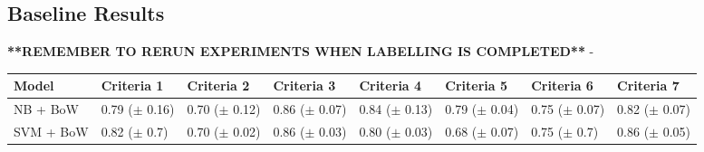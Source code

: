 \documentclass[a4paper,twoside,phd]{BYUPhys}
\begin{document}
\subsection{Baseline Results}
\label{sec:BaselineResults}
\textbf{**REMEMBER TO RERUN EXPERIMENTS WHEN LABELLING IS COMPLETED**}
- 
\begin{table}[H]
	\centering
	\begin{tabular}{|p{1.7cm}|p{1.6cm}|p{1.6cm}|p{1.6cm}|p{1.6cm}|p{1.6cm}|p{1.6cm}|p{1.6cm}|}
		\hline
		Model & Criteria 1                                                                           & Criteria 2    & Criteria 3 & Criteria 4 & Criteria 5 & Criteria 6 & Criteria 7                                                                                                                                                                                                                                                                                                                                                          \\
		\hline
		NB + BoW  & 0.79 \newline ($\pm$ 0.16) & 0.70 \newline ($\pm$ 0.12) & 0.86 \newline ($\pm$ 0.07) & 0.84 \newline ($\pm$ 0.13) & 0.79 \newline ($\pm$ 0.04)  & 0.75 \newline ($\pm$ 0.07)  & 0.82 \newline ($\pm$ 0.07)   \\
		\hline
		
		SVM + BoW  & 0.82 \newline ($\pm$ 0.7) & 0.70 \newline ($\pm$ 0.02) & 0.86 \newline ($\pm$ 0.03) & 0.80 \newline ($\pm$ 0.03) & 0.68 \newline ($\pm$ 0.07)  & 0.75 \newline ($\pm$ 0.7)  & 0.86 \newline ($\pm$ 0.05)                                                                                                                                             \\
		\hline                                                                                                                                                                                                                
				

\end{tabular}
\end{table}
\end{document}
